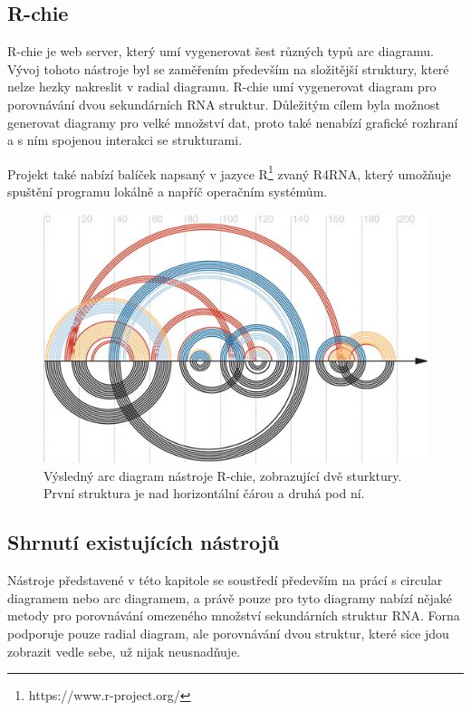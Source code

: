 \subsection{R-chie} 

R-chie \cite{Rchie} je web server, který umí vygenerovat šest různých typů arc
diagramu. Vývoj tohoto nástroje byl se zaměřením především na složitější
struktury, které nelze hezky nakreslit v radial diagramu. R-chie umí
vygenerovat diagram pro porovnávání dvou sekundárních RNA struktur. Důležitým
cílem byla možnost generovat diagramy pro velké množství dat, proto také
nenabízí grafické rozhraní a s ním spojenou interakci se strukturami. 

Projekt také nabízí balíček napsaný v jazyce
R\footnote{https://www.r-project.org/} zvaný R4RNA, který umožňuje spuštění
programu lokálně a napříč operačním systémům.

\begin{figure}[H]
  \centering
  \includegraphics[width=140mm]{../img/kap01/rchie.jpeg}
  \caption{Výsledný arc diagram nástroje R-chie, zobrazující dvě sturktury.
  První struktura je nad horizontální čárou a druhá pod ní.}
\end{figure}

\subsection{Shrnutí existujících nástrojů}

Nástroje představené v této kapitole se soustředí především na prácí s circular
diagramem nebo arc diagramem, a právě pouze pro tyto diagramy nabízí nějaké
metody pro porovnávání omezeného množství sekundárních struktur RNA. Forna
podporuje pouze radial diagram, ale porovnávání dvou struktur, které sice jdou
zobrazit vedle sebe, už nijak neusnadňuje. 

